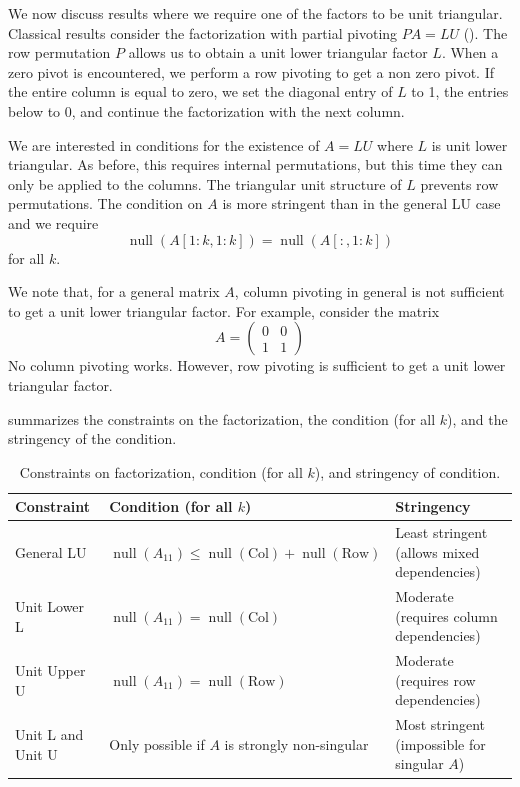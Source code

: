 \documentclass{article}
\DeclareMathOperator{\nl}{null}
\begin{document}
We now discuss results where we require one of the factors to be unit triangular. Classical results consider the factorization with partial pivoting $PA = LU$ (). The row permutation $P$ allows us to obtain a unit lower triangular factor $L$. When a zero pivot is encountered, we perform a row pivoting to get a non zero pivot. If the entire column is equal to zero, we set the diagonal entry of $L$ to 1, the entries below to 0, and continue the factorization with the next column.

We are interested in conditions for the existence of $A=LU$ where $L$ is unit lower triangular. As before, this requires internal permutations, but this time they can only be applied to the columns. The triangular unit structure of $L$ prevents row permutations. The condition on $A$ is more stringent than in the general LU case and we require
\[
    \nl(A[1:k,1:k]) = \nl(A[:,1:k])
\]
for all $k$.

We note that, for a general matrix $A$, column pivoting in general is not sufficient to get a unit lower triangular factor. For example, consider the matrix
\[
    A = \begin{pmatrix}
        0 & 0 \\
        1 & 1
    \end{pmatrix}
\]
No column pivoting works. However, row pivoting is sufficient to get a unit lower triangular factor.

 summarizes the constraints on the factorization, the condition (for all $k$), and the stringency of the condition.

\begin{table}[htbp]
    \centering
    \begin{tabular}{lp{5cm}p{7cm}}
        \toprule
        Constraint & Condition (for all $k$) & Stringency \\
        \midrule
        General LU & \raggedright $\nl(A_{11}) \le \nl(\text{Col}) + \nl(\text{Row})$ & Least stringent (allows mixed dependencies) \\
        Unit Lower L & $\nl(A_{11}) = \nl(\text{Col})$ & Moderate (requires column dependencies) \\
        Unit Upper U & $\nl(A_{11}) = \nl(\text{Row})$ & Moderate (requires row dependencies) \\
        Unit L and Unit U & \raggedright Only possible if $A$ is strongly non-singular & Most stringent (impossible for singular $A$) \\
        \bottomrule
    \end{tabular}
    \caption{Constraints on factorization, condition (for all $k$), and stringency of condition.}\label{tab:constraints}
\end{table}
\end{document}
